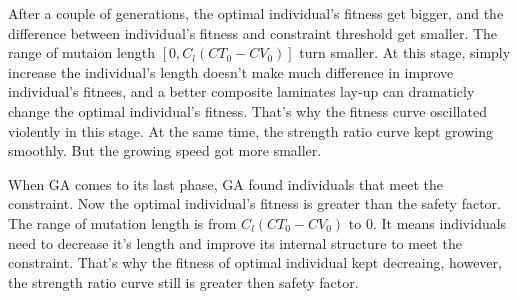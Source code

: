 After a couple of generations, the optimal individual's fitness get bigger, and the difference
between individual's fitness and constraint threshold get smaller. The range of mutaion length $[0,
C_l(CT_0 - CV_0)]$ turn smaller. At this stage, simply increase the individual's length doesn't make
much difference in improve individual's fitnees, and a better composite laminates lay-up can
dramaticly change the optimal individual's fitness. That's why the fitness curve oscillated
violently in this stage.  At the same time, the strength ratio curve kept growing smoothly. But the
growing speed got more smaller.

When GA comes to its last phase, GA found individuals that meet the constraint. Now the optimal
individual's fitness is greater than the safety factor. The range of mutation length is from 
$C_l(CT_0 - CV_0)$ to 0. It means individuals need to decrease it's length and improve its internal
structure to meet the constraint. That's why the fitness of optimal individual kept decreaing,
however, the strength ratio curve still is greater then safety factor.

